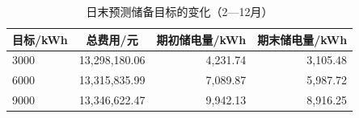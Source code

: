 \par
\begin{table}[!htbp]
\centering
\caption{日末预测储备目标的变化（2—12月）}\label{tab:q3-reserve}
\normalsize
\begin{tabular}{lrrr}
\toprule
\multicolumn{1}{c}{目标/kWh} & \multicolumn{1}{c}{总费用/元} & \multicolumn{1}{c}{期初储电量/kWh} & \multicolumn{1}{c}{期末储电量/kWh} \\
\midrule
3000 & 13,298,180.06 & 4,231.74 & 3,105.48 \\
6000 & 13,315,835.99 & 7,089.87 & 5,987.72 \\
9000 & 13,346,622.47 & 9,942.13 & 8,916.25 \\
\bottomrule
\end{tabular}
\end{table}
\par
